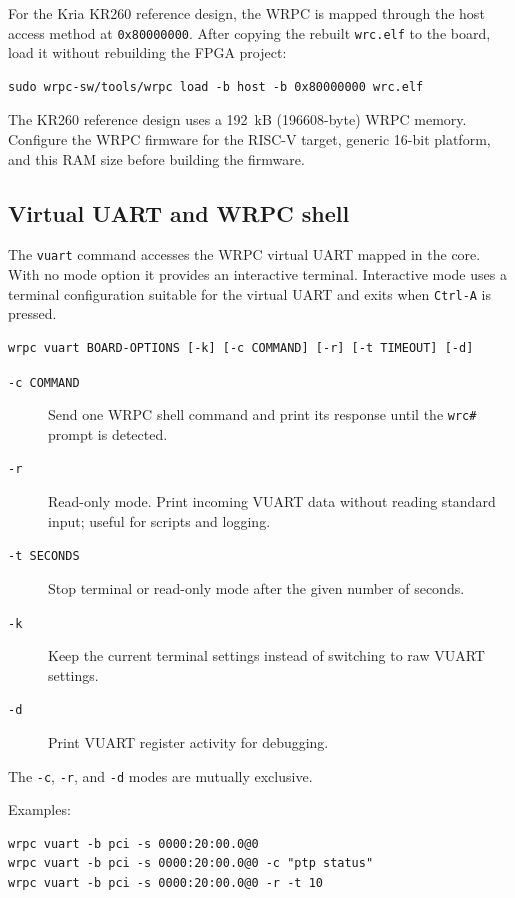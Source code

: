 \documentclass[a4paper,12pt]{article}
\begin{document}
For the Kria KR260 reference design, the WRPC is mapped through the host
access method at \texttt{0x80000000}. After copying the rebuilt
\texttt{wrc.elf} to the board, load it without rebuilding the FPGA project:

\begin{lstlisting}
sudo wrpc-sw/tools/wrpc load -b host -b 0x80000000 wrc.elf
\end{lstlisting}

The KR260 reference design uses a 192~kB (196608-byte) WRPC memory. Configure
the WRPC firmware for the RISC-V target, generic 16-bit platform, and this RAM
size before building the firmware.

\subsection{Virtual UART and WRPC shell}

The \texttt{vuart} command accesses the WRPC virtual UART mapped in the core.
With no mode option it provides an interactive terminal. Interactive mode uses
a terminal configuration suitable for the virtual UART and exits when
\texttt{Ctrl-A} is pressed.

\begin{lstlisting}
wrpc vuart BOARD-OPTIONS [-k] [-c COMMAND] [-r] [-t TIMEOUT] [-d]
\end{lstlisting}

\begin{description}
\item[\texttt{-c COMMAND}] Send one WRPC shell command and print its response
  until the \texttt{wrc\#} prompt is detected.
\item[\texttt{-r}] Read-only mode. Print incoming VUART data without reading
  standard input; useful for scripts and logging.
\item[\texttt{-t SECONDS}] Stop terminal or read-only mode after the given
  number of seconds.
\item[\texttt{-k}] Keep the current terminal settings instead of switching
  to raw VUART settings.
\item[\texttt{-d}] Print VUART register activity for debugging.
\end{description}

The \texttt{-c}, \texttt{-r}, and \texttt{-d} modes are mutually exclusive.

Examples:

\begin{lstlisting}
wrpc vuart -b pci -s 0000:20:00.0@0
wrpc vuart -b pci -s 0000:20:00.0@0 -c "ptp status"
wrpc vuart -b pci -s 0000:20:00.0@0 -r -t 10
\end{lstlisting}
\end{document}
